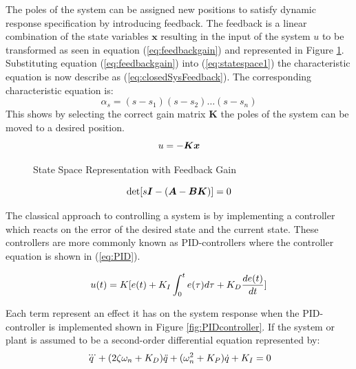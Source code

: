 \documentclass[a4paper,12pt]{article}
\begin{document}
	 The poles of the system can be assigned new positions to satisfy dynamic response specification by introducing feedback. The feedback is a linear combination of the state variables $\boldsymbol{x}$ resulting in the input of the system $u$ to be transformed as seen in equation (\ref{eq:feedbackgain}) and represented in Figure \ref{fig:linearSys}. Substituting equation (\ref{eq:feedbackgain}) into (\ref{eq:statespace1}) the characteristic equation is now describe as (\ref{eq:closedSysFeedback}). The corresponding characteristic equation is: $$\alpha_{s}=(s-s_{1})(s-s_{2})\ldots(s-s_{n}) $$ This shows by selecting the correct gain matrix \textbf{K} the poles of the system can be moved to a desired position.
	 \begin{equation} \label{eq:feedbackgain}
	 \centering
	 u = -\boldsymbol{K}\boldsymbol{x}
	 \end{equation}
	 
	 \begin{figure}
	 	\centering
	 	
	 	\caption{State Space Representation with Feedback Gain}
	 	\label{fig:linearSys}
	 \end{figure}
 
	\begin{equation} \label{eq:closedSysFeedback}
 	\centering
 	\text{det}[s\boldsymbol{I}-(\boldsymbol{A}-\boldsymbol{B}\boldsymbol{K})] = 0
 	\end{equation}
 	
 	The classical approach to controlling a system is by implementing a controller which reacts on the error of the desired state and the current state. These controllers are more commonly known as PID-controllers where the controller equation is shown in (\ref{eq:PID}).
 	
 	\begin{equation} \label{eq:PID}
 	\centering
 	u(t) = K[ e(t)+K_{I}\int_{0}^{t}e(\tau)d\tau +K_{D}\frac{de(t)}{dt}]
 	\end{equation}
 	
 	Each term represent an effect it has on the system response when the PID-controller is implemented shown in Figure \ref{fig:PIDcontroller}. If the system or plant is assumed to be a second-order differential equation represented by:
 	\begin{equation} \label{eq:PID_system}
 	\centering
 	 \dddot{q}+(2\zeta\omega_{n}+K_{D})\ddot{q}+(\omega_{n}^2+K_{P})\dot{q}+K_{I} = 0
 	\end{equation}
 	
\end{document}
